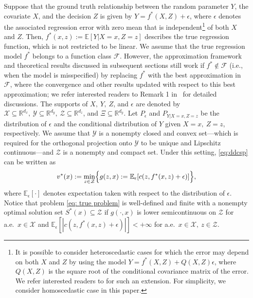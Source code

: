 \documentclass[onefignum,onetabnum]{siamart251216}
\begin{document}
Suppose that the ground truth relationship between the random parameter $Y$, the covariate $X$, and the decision $Z$ is given by $Y = f^*(X, Z) + \epsilon$, where $\epsilon$ denotes the associated regression error with zero mean that is independent\footnote{It is possible to consider heteroscedastic cases for which the error may depend on both $X$ and $Z$ by using the model  $Y = f^*(X, Z) + Q(X,Z) \epsilon$, where $Q(X,Z)$ is the square root of the conditional covariance matrix of the error. We refer interested readers to \cite{kannan2025data} for such an extension. For simplicity, we consider homoscedastic case in this paper.} of both $X$ and $Z$. Then, $f^*(x,z):=\mathbb{E}[Y|X=x, Z=z]$ describes the true regression function, which is not restricted to be linear. We assume that the true regression model $f^*$ belongs to a function class $\mathcal{F}$. However, the approximation framework and theoretical results discussed in subsequent sections still work if $f^*\not\in \mathcal{F}$ (i.e., when the model is misspecified) by replacing $f^*$ with the best approximation in $\mathcal{F}$, where the convergence and other results updated with respect to this best approximation; we refer interested readers to Remark 1 in~\cite{kannan2020residuals} for detailed discussions.
The supports of $X,\ Y,\ Z$, and $\epsilon$ are denoted by $\mathcal{X}\subseteq \mathbb{R}^{d_x},\  \mathcal{Y} \subseteq \mathbb{R}^{d_y},\ \mathcal{Z} \subseteq \mathbb{R}^{d_z}$, and $\Xi \subseteq \mathbb{R}^{d_y}$. Let $P_{\epsilon}$ and $P_{Y|X=x,Z=z}$ be the distribution of $\epsilon$ and the conditional distribution of $Y$ given $X=x,\ Z=z$, respectively. We assume that
 $\mathcal{Y}$ is a nonempty closed and convex set---which is required for the orthogonal projection onto $\mathcal{Y}$ to be unique and Lipschitz continuous---and $\mathcal{Z}$ is a nonempty and compact set. Under this setting, \eqref{eq:ddcsp} can be written as
\begin{equation}\label{eq: true problem}
  v^*(x):=\min_{z \in \mathcal{Z}} \Bigl\{g(z,x):=\mathbb{E}_\epsilon[c(z,f^*(x,z) + \epsilon)]\Bigr\},
\end{equation}
where $\mathbb{E}_\epsilon[\cdot]$ denotes expectation taken with respect to the distribution of $\epsilon$. Notice that  problem \eqref{eq: true problem} is well-defined and finite with a nonempty optimal solution set $S^*(x) \subseteq \mathcal{Z}$ if $g(\cdot,x)$ is lower semicontinuous on $\mathcal{Z}$ for a.e.\ $x \in \mathcal{X}$ and $\mathbb{E}_\epsilon[|c(z,f^*(x,z) + \epsilon)|] <+\infty$ for a.e.\ $x \in \mathcal{X},\ z \in \mathcal{Z}$.
\end{document}

